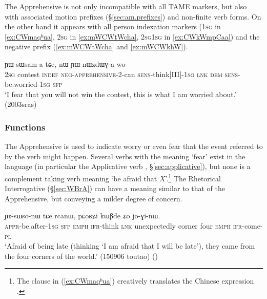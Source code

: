 The Apprehensive is not only incompatible with all TAME markers, but also with associated motion prefixes (§\ref{sec:am.prefixes}) and non-finite verb forms. On the other hand it appears with all person indexation markers (\textsc{1sg} in \ref{ex:CWmaqʰua}, \textsc{2sg} in \ref{ex:mWCWtWcha}, 2\textsc{sg}\fl{}1\textsc{sg} in \ref{ex:CWkWmpCaa}) and the negative prefix  (\ref{ex:mWCWtWcha} and \ref{ex:mWCWkhW}). 

  \begin{exe}
\ex \label{ex:mWCWtWcha}
 ɲɯ-sɯsam-a tɕe, nɯ ɲɯ-nɯzdɯɣ-a wo \\
\textsc{2sg} contest \textsc{indef} \textsc{neg}-\textsc{apprehensive}-2-can \textsc{sens}-think[III]-\textsc{1sg} \textsc{lnk} \textsc{dem} \textsc{sens}-be.worried-\textsc{1sg} \textsc{sfp} \\
\glt  `I fear that you will not win the contest, this is what I am worried about.' (2003sras)
 \end{exe}

\subsubsection{Functions} \label{sec:apprehensive.function}
The Apprehensive is used to indicate worry or even fear that the event referred to by the verb might happen. Several verbs with the meaning `fear' exist in the language (in particular the Applicative verb , §\ref{sec:applicative}), but none is a complement taking verb meaning `be afraid that $X$'.\footnote{The clause     in (\ref{ex:CWmaqʰua}) creatively translates the Chinese expression . }     The Rhetorical Interrogative (§\ref{sec:WBrA}) can have a meaning similar to that of the Apprehensive, but conveying a milder degree of concern.

\begin{exe}
\ex \label{ex:CWmaqʰua}
\gll  [ɕɯ-maqʰu-a kɯ ʑo] ɲɤ-sɯso-nɯ tɕe rcanɯ, pɕoʁʑi kɯβde ʑo jo-ɣi-nɯ.  \\
\textsc{appr}-be.after-\textsc{1sg} \textsc{sfp} \textsc{emph} \textsc{ifr}-think \textsc{lnk} unexpectedly corner four \textsc{emph} \textsc{ifr}-come-\textsc{pl} \\
\glt `Afraid of being late (thinking `I am afraid that I will be late'), they came from the four corners of the world.' (150906 toutao)
()
 \end{exe}
 
